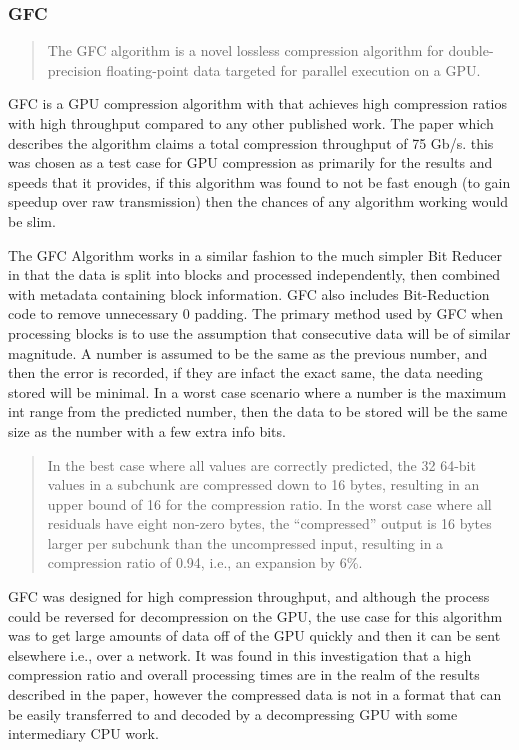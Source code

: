 \documentclass[12pt,a4paper]{article}
\begin{document}
\subsubsection{GFC}
\blockquote[\cite{GpuFP}]{The GFC algorithm is a novel lossless compression algorithm for double-precision floating-point data targeted for parallel execution on a GPU.}

GFC is a GPU compression algorithm with that achieves high compression ratios with high throughput compared to any other published work. The paper which describes the algorithm claims a total compression throughput of 75 Gb/s. this was chosen as a test case for GPU compression as primarily for the results and speeds that it provides, if this algorithm was found to not be fast enough (to gain speedup over raw transmission) then the chances of any algorithm working would be slim.

The GFC Algorithm works in a similar fashion to the much simpler Bit Reducer in that the data is split into blocks and processed independently, then combined with metadata containing block information. GFC also includes Bit-Reduction code to remove unnecessary 0 padding.
The primary method used by GFC when processing blocks is to use the assumption that consecutive data will be of similar magnitude. A number is assumed to be the same as the previous number, and then the error is recorded, if they are infact the exact same, the data needing stored will be minimal. In a worst case scenario where a number is the maximum int range from the predicted number, then the data to be stored will be the same size as the number with a few extra info bits. 

\blockquote[\cite{GpuFP}]{In the best case where all values are correctly predicted, the 32 64-bit values in a subchunk are compressed down to 16 bytes, resulting in an upper bound of 16 for the compression ratio. In the worst case where all residuals have eight non-zero bytes, the “compressed” output is 16 bytes larger per subchunk than the uncompressed input, resulting in a compression ratio of 0.94, i.e., an expansion by 6\%.}

GFC was designed for high compression throughput, and although the process could be reversed for decompression on the GPU, the use case for this algorithm was to get large amounts of data off of the GPU quickly and then it can be sent elsewhere i.e., over a network. It was found in this investigation that a high compression ratio and overall processing times are in the realm of the results described in the paper, however the compressed data is not in a format that can be easily transferred to and decoded by a decompressing GPU with some intermediary CPU work.
\end{document}
